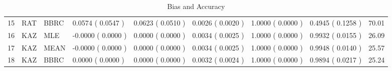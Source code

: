 \begin{table}[t]
\begin{center}
\begin{tabular}{rlllllllr}
  15 & RAT & BBRC & 0.0574 ( 0.0547 ) & 0.0623 ( 0.0510 ) & 0.0026 ( 0.0020 ) & 1.0000 ( 0.0000 ) & 0.4945 ( 0.1258 ) & 70.01 \\ 
  16 & KAZ & MLE & -0.0000 ( 0.0000 ) & 0.0000 ( 0.0000 ) & 0.0034 ( 0.0025 ) & 1.0000 ( 0.0000 ) & 0.9932 ( 0.0155 ) & 26.09 \\ 
  17 & KAZ & MEAN & -0.0000 ( 0.0000 ) & 0.0000 ( 0.0000 ) & 0.0034 ( 0.0025 ) & 1.0000 ( 0.0000 ) & 0.9948 ( 0.0140 ) & 25.57 \\ 
  18 & KAZ & BBRC & 0.0000 ( 0.0000 ) & 0.0000 ( 0.0000 ) & 0.0032 ( 0.0024 ) & 1.0000 ( 0.0000 ) & 0.9894 ( 0.0217 ) & 25.24 \\ 
   \hline
\end{tabular}
\caption{Bias and Accuracy}
\label{t:anal}
\end{center}
\end{table}
